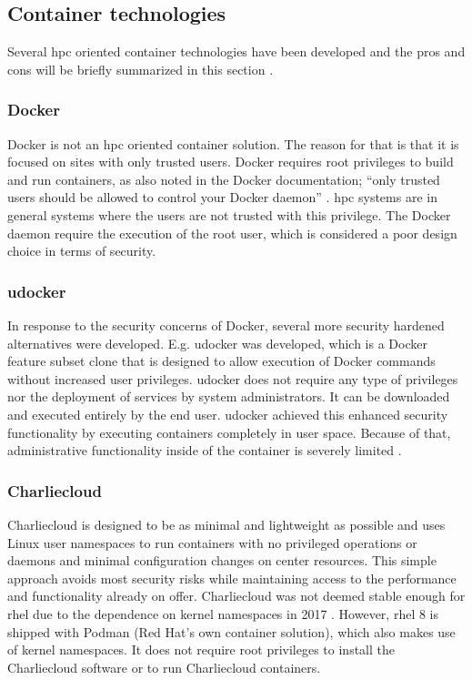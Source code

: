 \documentclass[conference]{IEEEtran}
\begin{document}
\subsection{Container technologies}
Several \gls{hpc} oriented container technologies have been developed and the pros and cons will be briefly summarized in this section \cite{hpc-workloads-justin, saha2018evaluation, stackhpc-state-of-hpc}.


\subsubsection{Docker}
Docker is not an \gls{hpc} oriented container solution. The reason for that is that it is focused on sites with only trusted users. Docker requires root privileges to build and run containers, as also noted in the Docker documentation; ``only trusted users should be allowed to control your Docker daemon'' \cite{docker-security}. \gls{hpc} systems are in general systems where the users are not trusted with this privilege. The Docker daemon require the execution of the root user, which is considered a poor design choice in terms of security.


\subsubsection{udocker}
In response to the security concerns of Docker, several more security hardened alternatives were developed. E.g. udocker was developed, which is a Docker feature subset clone that is designed to allow execution of Docker commands without increased user privileges. udocker does not require any type of privileges nor the deployment of services by system administrators. It can be downloaded and executed entirely by the end user. udocker achieved this enhanced security functionality by executing containers completely in user space. Because of that, administrative functionality inside of the container is severely limited \cite{utah-udocker}.


\subsubsection{Charliecloud}
Charliecloud is designed to be as minimal and lightweight as possible and uses Linux user namespaces to run containers with no privileged operations or daemons and minimal configuration changes on center resources. This simple approach avoids most security risks while maintaining access to the performance and functionality already on offer. Charliecloud was not deemed stable enough for \gls{rhel} due to the dependence on kernel namespaces in 2017 \cite{kurtzer2017singularity}. However, \gls{rhel} 8 is shipped with Podman (Red Hat's own container solution), which also makes use of kernel namespaces. It does not require root privileges to install the Charliecloud software or to run Charliecloud containers.
\end{document}
